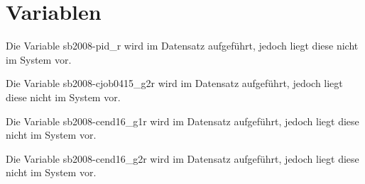 \documentclass[a4paper]{article}
\begin{document}


\newpage
\section{Variablen}

				

		Die Variable sb2008-pid\_r wird im Datensatz aufgeführt, jedoch liegt diese nicht im System vor.

				

				

				

				

				

				

				

				

				

		Die Variable sb2008-cjob0415\_g2r wird im Datensatz aufgeführt, jedoch liegt diese nicht im System vor.

				

				

				

				

				

				

				

		Die Variable sb2008-cend16\_g1r wird im Datensatz aufgeführt, jedoch liegt diese nicht im System vor.

		Die Variable sb2008-cend16\_g2r wird im Datensatz aufgeführt, jedoch liegt diese nicht im System vor.

				

				

				

				

				
\end{document}

